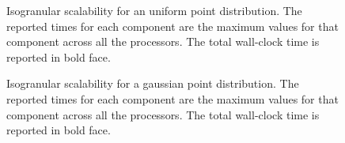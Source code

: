 
\begin{figure}
	\begin{center}
	
	\end{center}
\caption{\label{f:isoUniform} Isogranular scalability for an uniform point distribution. The reported times for 
each component are the maximum values for that component across all the processors. The total wall-clock
time is reported in bold face.} 
\end{figure}

\begin{figure}
	\begin{center}
	
	\end{center}
\caption{\label{f:isoGaussian} Isogranular scalability for a gaussian point distribution.  
The reported times for each component are the maximum values for that component across all the processors. The total wall-clock
time is reported in bold face.} 
\end{figure}
